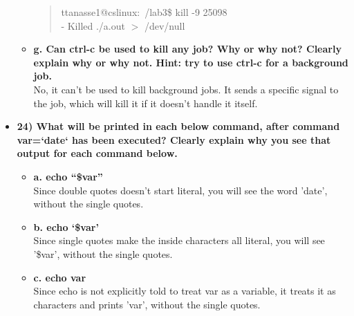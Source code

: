 \documentclass{article}
\begin{document}
\begin{itemize}
\begin{itemize}
\begin{quote}
      ttanasse1@cslinux:~/lab3\$ kill -9 25098\\ \relax
[1]-  Killed                  ./a.out $>$ /dev/null
    \end{quote}
    \item \textbf{g. Can ctrl-c be used to kill any job? Why or why not? Clearly explain why or why not. Hint: try to use ctrl-c for a background job.}\\
    No, it can't be used to kill background jobs. It sends a specific signal to the job, which will kill it if it doesn't handle it itself.
  \end{itemize}
  \item \textbf{24) What will be printed in each below command, after command var=`date` has been executed? Clearly explain why you see that output for each command below.}
    \begin{itemize}
      \item \textbf{a. echo “\$var”}\\
      Since double quotes doesn't start literal, you will see the word 'date', without the single quotes. 
      \item \textbf{b. echo ‘\$var’}\\
      Since single quotes make the inside characters all literal, you will see '\$var', without the single quotes.
      \item \textbf{c. echo var}\\
      Since echo is not explicitly told to treat var as a variable, it treats it as characters and prints 'var', without the single quotes.
    \end{itemize}
  \end{itemize}
\end{document}
